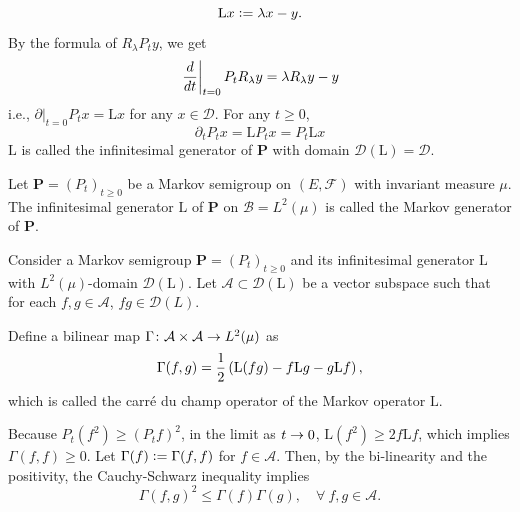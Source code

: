 \begin{enumerate}[label=\arabic{*}.]
	\begin{equation*}
		\mathrm{L}x \vcentcolon= \lambda x - y.
	\end{equation*}
	By the formula of $R_\lambda P_t y$, we get
	\begin{equation*}
		\left.\frac{d}{dt}\right\lvert_{t=0}P_t R_\lambda y = \lambda R_{\lambda} y - y
	\end{equation*}
	i.e., $\partial|_{t=0} P_t x = \mathrm{L}x$ for any $x \in \mathcal{D}$. For any $t \geq 0$,
	\begin{equation*}
		\partial_t P_t x=\mathrm{L} P_t x=P_t \mathrm{L} x
	\end{equation*}
	$\mathrm{L}$ is called the infinitesimal generator of $\mathbf{P}$ with domain $\mathcal{D}(\mathrm{L}) = \mathcal{D}$.

	\begin{defn}
	    Let $\mathbf{P} = (P_t)_{t \geq 0}$ be a Markov semigroup on $(E,\mathcal{F})$ with invariant measure $\mu$. The infinitesimal generator $\mathrm{L}$ of $\mathbf{P}$ on $\mathcal{B} = L^2(\mu)$ is called the Markov generator of $\mathbf{P}$.
	\end{defn}

	Consider a Markov semigroup $\mathbf{P}=(P_t)_{t \geq 0}$ and its infinitesimal generator $\mathrm{L}$ with $L^2(\mu)$-domain $\mathcal{D}(\mathrm{L})$. Let $\mathcal{A} \subset \mathcal{D}(\mathrm{L})$ be a vector subspace such that for each $f,g \in \mathcal{A}$, $fg \in \mathcal{D}(L)$.

	\begin{defn}
	    Define a bilinear map $\Gamma \colon \mathcal{A} \times \mathcal{A} \rightarrow L^2(\mu)$ as
	    \begin{equation*}
	    	\Gamma(f,g) = \frac{1}{2}\left(\mathrm{L}(fg) - f\mathrm{L}g - g\mathrm{L}f\right),
	    \end{equation*}
	    which is called the carr\'e du champ operator of the Markov operator $\mathrm{L}$.
	\end{defn}

	Because $P_t(f^2) \geq (P_tf)^2$, in the limit as $t \rightarrow 0$, $\mathrm{L}(f^2) \geq 2f\mathrm{L}f$, which implies $\Gamma(f,f) \geq 0$. Let $\Gamma(f) \vcentcolon= \Gamma(f,f)$ for $f \in \mathcal{A}$. Then, by the bi-linearity and the positivity, the Cauchy-Schwarz inequality implies
	\begin{equation*}
		\Gamma(f,g)^2 \leq \Gamma(f)\Gamma(g),\quad \forall~f,g \in \mathcal{A}.
	\end{equation*}


\end{enumerate}
